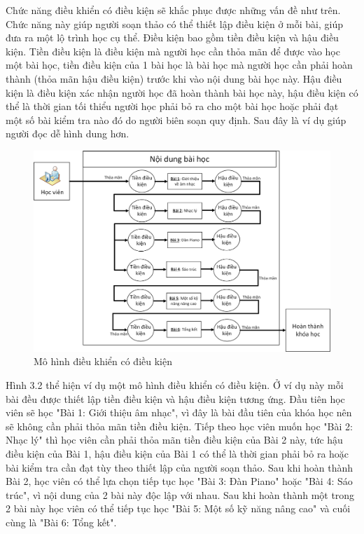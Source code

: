 Chức năng điều khiển có điều kiện sẽ khắc phục được những vấn đề như trên. Chức năng này giúp người soạn thảo có thể thiết lập điều kiện ở mỗi bài, giúp đưa ra một lộ trình học cụ thể. Điều kiện bao gồm tiền điều kiện và hậu điều kiện. Tiền điều kiện là điều kiện mà người học cần thỏa mãn để được vào học một bài học, tiền điều kiện của 1 bài học là bài học mà người học cần phải hoàn thành (thỏa mãn hậu điều kiện) trước khi vào nội dung bài học này. Hậu điều kiện là điều kiện xác nhận người học đã hoàn thành bài học này, hậu điều kiện có thể là thời gian tối thiểu người học phải bỏ ra cho một bài học hoặc phải đạt một số bài kiểm tra nào đó do người biên soạn quy định. Sau đây là ví dụ giúp người đọc dễ hình dung hơn.

\vspace{1cm}

\begin{center}
	\begin{figure}[htp]
		\begin{center}
			\includegraphics[width=16cm]{Chapter3/Pictures/picture32.png}
		\end{center}
		\caption{Mô hình điều khiển có điều kiện}
		\label{refpicture13}
	\end{figure}
\end{center}


	Hình 3.2 thể hiện ví dụ một mô hình điều khiển có điều kiện. Ở ví dụ này mỗi bài đều được thiết lập tiền điều kiện và hậu điều kiện tương ứng. Đầu tiên học viên sẽ học "Bài 1: Giới thiệu âm nhạc", vì đây là bài đầu tiên của khóa học nên sẽ không cần phải thỏa mãn tiền điều kiện. Tiếp theo học viên muốn học "Bài 2: Nhạc lý" thì học viên cần phải thỏa mãn tiền điều kiện của Bài 2 này, tức hậu điều kiện của Bài 1, hậu điều kiện của Bài 1 có thể là thời gian phải bỏ ra hoặc bài kiểm tra cần đạt tùy theo thiết lập của người soạn thảo. Sau khi hoàn thành Bài 2, học viên có thể lựa chọn tiếp tục học "Bài 3: Đàn Piano" hoặc "Bài 4: Sáo trúc", vì nội dung của 2 bài này độc lập với nhau. Sau khi hoàn thành một trong 2 bài này học viên có thể tiếp tục học "Bài 5: Một số kỹ năng nâng cao" và cuối cùng là "Bài 6: Tổng kết".

